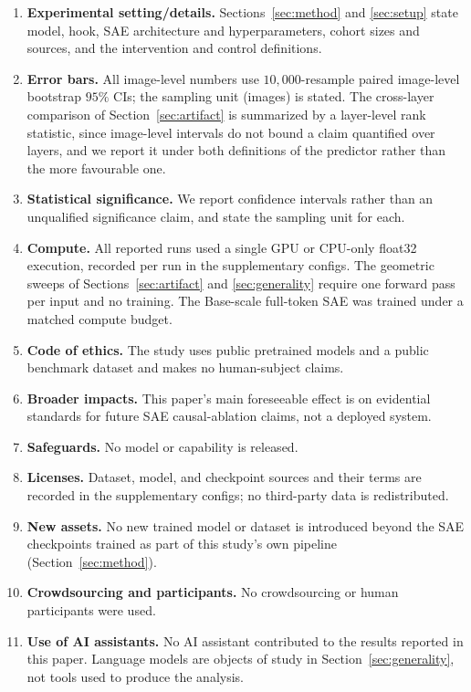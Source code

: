 \documentclass{article}
\begin{document}
\begin{enumerate}
\item \textbf{Experimental setting/details.} \answerYes{} Sections~\ref{sec:method} and \ref{sec:setup} state model, hook, SAE architecture and hyperparameters, cohort sizes and sources, and the intervention and control definitions.
\item \textbf{Error bars.} \answerYes{} All image-level numbers use $10{,}000$-resample paired image-level bootstrap $95\%$ CIs; the sampling unit (images) is stated. The cross-layer comparison of Section~\ref{sec:artifact} is summarized by a layer-level rank statistic, since image-level intervals do not bound a claim quantified over layers, and we report it under both definitions of the predictor rather than the more favourable one.
\item \textbf{Statistical significance.} \answerYes{} We report confidence intervals rather than an unqualified significance claim, and state the sampling unit for each.
\item \textbf{Compute.} \answerYes{} All reported runs used a single GPU or CPU-only float32 execution, recorded per run in the supplementary configs. The geometric sweeps of Sections~\ref{sec:artifact} and \ref{sec:generality} require one forward pass per input and no training. The Base-scale full-token SAE was trained under a matched compute budget.
\item \textbf{Code of ethics.} \answerYes{} The study uses public pretrained models and a public benchmark dataset and makes no human-subject claims.
\item \textbf{Broader impacts.} \answerNA{} This paper's main foreseeable effect is on evidential standards for future SAE causal-ablation claims, not a deployed system.
\item \textbf{Safeguards.} \answerNA{} No model or capability is released.
\item \textbf{Licenses.} \answerYes{} Dataset, model, and checkpoint sources and their terms are recorded in the supplementary configs; no third-party data is redistributed.
\item \textbf{New assets.} \answerNo{} No new trained model or dataset is introduced beyond the SAE checkpoints trained as part of this study's own pipeline (Section~\ref{sec:method}).
\item \textbf{Crowdsourcing and participants.} \answerNA{} No crowdsourcing or human participants were used.
\item \textbf{Use of AI assistants.} \answerYes{} No AI assistant contributed to the results reported in this paper. Language models are objects of study in Section~\ref{sec:generality}, not tools used to produce the analysis.
\end{enumerate}
\end{document}
